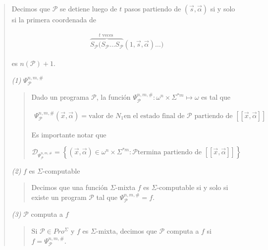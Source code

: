 \documentclass[a4paper, 12pt]{article}
\begin{document}
\small
\begin{quote}

Decimos que $\mathcal{P}$ se detiene luego de $t$ pasos partiendo de $(\vec{s},
\vec{\alpha})$ si y solo si la primera coordenada de 

\begin{align*}
    \overbrace{ S_{\mathcal{P}}( S_{\mathcal{P}} \ldots S_{\mathcal{P}}}^{t
    \text{ veces }}(1, \vec{s}, \vec{\alpha})\ldots)
\end{align*}

es $n(\mathcal{P}) + 1$.

\pagebreak 

\textit{(1)} $\Psi_{\mathcal{P}}^{n, m, \#}$


\small
\begin{quote}

Dado un programa $\mathcal{P}$, la función $\Psi_{\mathcal{P}}^{n, m, \#} :
\omega^{n} \times \Sigma^{*m} \mapsto \omega$ es tal que 

\begin{align*}
    \Psi_{\mathcal{P}}^{n, m, \#}(\vec{x}, \vec{\alpha}) = \text{valor de $N_1$
    en el estado final de $\mathcal{P}$ partiendo de $[\![ \vec{x},
    \vec{\alpha}]\!]$}
\end{align*}

Es importante notar que 

$$\mathcal{D}_{\Psi_{\mathcal{P}}^{n, m, \#}} = \left\{
(\vec{x}, \vec{\alpha}) \in \omega^{n} \times \Sigma^{*m} : \mathcal{P} \text{
termina partiendo de } [\![ \vec{x}, \vec{\alpha} ]\!] \right\} $$

\end{quote}
\normalsize

\textit{(2)} $f$ es $\Sigma$-computable  


\small
\begin{quote}

Decimos que una función $\Sigma$-mixta $f$ es $\Sigma$-computable si y solo si
existe un program $\mathcal{P}$ tal que $\Psi_{\mathcal{P}}^{n, m, \#} = f$.

\end{quote}
\normalsize

\textit{(3)} $\mathcal{P}$ computa a $f$

\small
\begin{quote}

Si $\mathcal{P} \in Pro^{\Sigma}$ y $f$ es $\Sigma$-mixta, decimos que
$\mathcal{P}$ computa a $f$ si $f = \Psi_{\mathcal{P}}^{n, m, \#}$.


\end{quote}
\end{quote}
\end{document}
